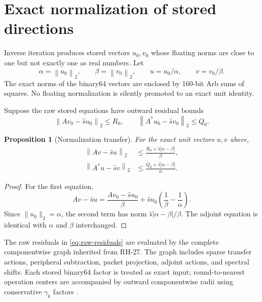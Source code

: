 \documentclass[11pt]{article}
\newtheorem{proposition}[theorem]{Proposition}
\theoremstyle{definition}
\theoremstyle{remark}
\newcommand{\norm}[1]{\left\lVert#1\right\rVert}
\begin{document}
\section{Exact normalization of stored directions}
\label{sec:normalization}

Inverse iteration produces stored vectors $u_0,v_0$ whose floating norms are
close to one but not exactly one as real numbers.  Let
\[
 \alpha=\norm{u_0}_2,
 \qquad
 \beta=\norm{v_0}_2,
 \qquad
 u=u_0/\alpha,
 \qquad
 v=v_0/\beta.
\]
The exact norms of the binary64 vectors are enclosed by 160-bit Arb sums of
squares.  No floating normalization is silently promoted to an exact unit
identity.

Suppose the raw stored equations have outward residual bounds
\begin{equation}
 \norm{Av_0-\widehat s u_0}_2\leq R_0,
 \qquad
 \norm{A^*u_0-\widehat s v_0}_2\leq Q_0.
 \label{eq:raw-residuals}
\end{equation}

\begin{proposition}[Normalization transfer]
\label{prop:normalization}
For the exact unit vectors $u,v$ above,
\begin{align}
 \norm{Av-\widehat s u}_2
 &\leq \frac{R_0+\widehat s|\alpha-\beta|}{\beta},
 \label{eq:normalized-right}\\
 \norm{A^*u-\widehat s v}_2
 &\leq \frac{Q_0+\widehat s|\alpha-\beta|}{\alpha}.
 \label{eq:normalized-left}
\end{align}
\end{proposition}

\begin{proof}
For the first equation,
\[
 Av-\widehat s u
 =\frac{Av_0-\widehat s u_0}{\beta}
 +\widehat s u_0\left(\frac1\beta-\frac1\alpha\right).
\]
Since $\|u_0\|_2=\alpha$, the second term has norm
$\widehat s|\alpha-\beta|/\beta$.  The adjoint equation is identical with
$\alpha$ and $\beta$ interchanged.
\end{proof}

The raw residuals in \cref{eq:raw-residuals} are evaluated by the complete
componentwise graph inherited from RH-27.  The graph includes sparse transfer
actions, peripheral subtraction, packet projection, adjoint actions, and
spectral shifts.  Each stored binary64 factor is treated as exact input;
round-to-nearest operation centers are accompanied by outward componentwise
radii using conservative $\gamma_k$ factors
\citep{Higham2002,Rump2010,MooreKearfottCloud2009}.
\end{document}
